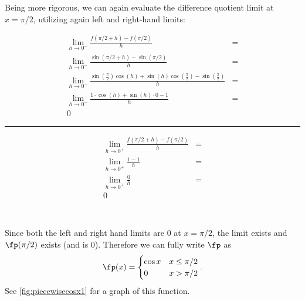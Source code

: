 \begin{example}
Being more rigorous, we can again evaluate the difference quotient limit at $x=\pi/2$, utilizing again left and right-hand limits:\\
{\small{}
\noindent\begin{minipage}{.59\linewidth}
\begin{align*}
\lim_{h\to0^-}\frac{f(\pi/2+h)-f(\pi/2)}{h} &=\\
\lim_{h\to0^-}\frac{\sin(\pi/2+h)-\sin(\pi/2)}{h}&=\\
\lim_{h\to0^-}{ \frac{\sin(\frac{\pi}{2})\cos(h)+\sin(h)\cos(\frac{\pi}{2})-\sin(\frac{\pi}{2})}{h}}&=\\
\lim_{h\to0^-}\frac{1\cdot\cos(h)+\sin(h)\cdot 0-1}{h} &=\\
0&
\end{align*}
\end{minipage}%
\begin{minipage}{1pt}
 \rule{.5pt}{100pt}%
\end{minipage}%
\begin{minipage}{.39\linewidth}
\begin{align*}
\lim_{h\to0^+}\frac{f(\pi/2+h)-f(\pi/2)}{h} &=\\
\lim_{h\to0^+}\frac{1-1}{h}&=\\
\lim_{h\to0^+}\frac{0}{h}&=\\
0&\\
\phantom{0}\\
\phantom{0}
\end{align*}
\end{minipage}
}


Since both the left and right hand limits are 0 at $x=\pi/2$, the limit exists and $\fp(\pi/2)$ exists (and is 0). Therefore we can fully write $\fp$ as
\[\fp(x) = \begin{cases}\cos x & x\leq\pi/2\\ 0 & x>\pi/2\end{cases}.\]
See \autoref{fig:piecewisecosx1} for a graph of this function.
\end{example}

